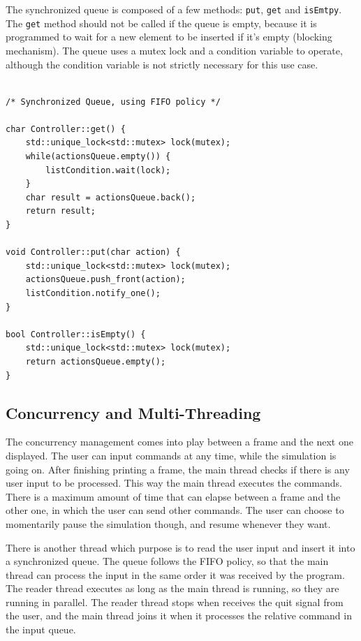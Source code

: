 \documentclass[10pt]{article}
\begin{document}
    The synchronized queue is composed of a few methods: \verb|put|, \verb|get| and \verb|isEmtpy|. The \verb|get| method should not be called if the queue is empty, because it is programmed to wait for a new element to be inserted if it's empty (blocking mechanism).
    The queue uses a mutex lock and a condition variable to operate, although the condition variable is not strictly necessary for this use case.

    \begin{verbatim}

/* Synchronized Queue, using FIFO policy */

char Controller::get() {
	std::unique_lock<std::mutex> lock(mutex);
	while(actionsQueue.empty()) {
		listCondition.wait(lock);
	}
	char result = actionsQueue.back();
	return result;
}

void Controller::put(char action) {
	std::unique_lock<std::mutex> lock(mutex);
	actionsQueue.push_front(action);
	listCondition.notify_one();
}

bool Controller::isEmpty() {
	std::unique_lock<std::mutex> lock(mutex);
	return actionsQueue.empty();
}

    \end{verbatim}

    \subsection{Concurrency and Multi-Threading}

    The concurrency management comes into play between a frame and the next one displayed. The user can input commands at any time, while the simulation is going on.
    After finishing printing a frame, the main thread checks if there is any user input to be processed. This way the main thread executes the commands.
    There is a maximum amount of time that can elapse between a frame and the other one, in which the user can send other commands. The user can choose to
    momentarily pause the simulation though, and resume whenever they want.

    There is another thread which purpose is to read the user input and insert it into a synchronized queue. The queue follows the FIFO policy, so that the main thread can process the input in the same order it was received by the program.
    The reader thread executes as long as the main thread is running, so they are running in parallel. The reader thread stops when receives the quit signal from the user, and the main thread joins it when it processes the relative command in the input queue.
\end{document}
